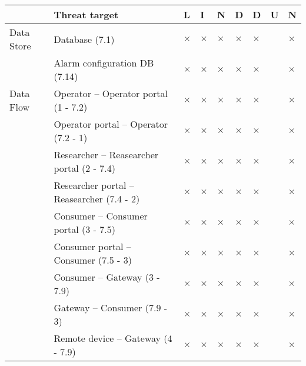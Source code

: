

\begin{table}[h!]
\begin{center}
\caption{ \label{table:LINDDUN_mapping_MUCs}}
\begin{longtable}{p{2.3cm} p{9cm} p{0.2cm} p{0.2cm} p{0.2cm} p{0.2cm}p{0.2cm} p{0.2cm} p{0.2cm} }
\toprule[1pt]
& Threat target & L & I & N & D & D & U & N \\
\midrule[0.5pt]
Data Store &  Database (7.1) & $\times$ & $\times$ & $\times$ & $\times$ & $\times$ &  & $\times$ \\
	   &  Alarm configuration DB (7.14) & $\times$ & $\times$ & $\times$ & $\times$ & $\times$ &  & $\times$ \\
\midrule[0.5pt]
Data Flow  &  Operator -- Operator portal (1 - 7.2) & $\times$ & $\times$ & $\times$& $\times$ &  $\times$ & & $\times$\\
		   &  Operator portal -- Operator (7.2 - 1) & $\times$ & $\times$ & $\times$& $\times$ &  $\times$ & & $\times$\\
		   &  Researcher -- Reasearcher portal (2 - 7.4) & $\times$ & $\times$ & $\times$& $\times$ &  $\times$ & & $\times$\\
		   &  Researcher portal -- Reasearcher (7.4 - 2) & $\times$ & $\times$ & $\times$& $\times$ &  $\times$ & & $\times$\\
		   &  Consumer -- Consumer portal (3 - 7.5) & $\times$ & $\times$ & $\times$& $\times$ &  $\times$ & & $\times$\\
		   &  Consumer portal -- Consumer (7.5 - 3) & $\times$ & $\times$ & $\times$& $\times$ &  $\times$ & & $\times$\\
		   &  Consumer -- Gateway (3 - 7.9) & $\times$ & $\times$ & $\times$& $\times$ &  $\times$ & & $\times$\\
		   &  Gateway -- Consumer (7.9 - 3) & $\times$ & $\times$ & $\times$& $\times$ &  $\times$ & & $\times$\\
		   &  Remote device -- Gateway (4 - 7.9) & $\times$ & $\times$ & $\times$& $\times$ &  $\times$ & & $\times$\\

\end{longtable}
\end{center}
\end{table}
